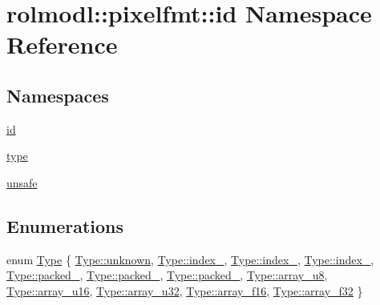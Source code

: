 \hypertarget{namespacerolmodl_1_1pixelfmt_1_1id}{}\section{rolmodl\+::pixelfmt\+::id Namespace Reference}
\label{namespacerolmodl_1_1pixelfmt_1_1id}
\subsection*{Namespaces}
\begin{DoxyCompactItemize}
\item 
 \mbox{\hyperlink{namespacerolmodl_1_1pixelfmt_1_1id_1_1id}{id}}
\item 
 \mbox{\hyperlink{namespacerolmodl_1_1pixelfmt_1_1id_1_1type}{type}}
\item 
 \mbox{\hyperlink{namespacerolmodl_1_1pixelfmt_1_1id_1_1unsafe}{unsafe}}
\end{DoxyCompactItemize}
\subsection*{Enumerations}
\begin{DoxyCompactItemize}
\item 
enum \mbox{\hyperlink{namespacerolmodl_1_1pixelfmt_1_1id_acacda2442a2997fe425e2faa4e5d002b}{Type}} \{ \newline
\mbox{\hyperlink{namespacerolmodl_1_1pixelfmt_1_1id_acacda2442a2997fe425e2faa4e5d002baad921d60486366258809553a3db49a4a}{Type\+::unknown}}, 
\mbox{\hyperlink{namespacerolmodl_1_1pixelfmt_1_1id_acacda2442a2997fe425e2faa4e5d002babe8994f2a03311f1f9ef19e65790e600}{Type\+::index\+\_}}, 
\mbox{\hyperlink{namespacerolmodl_1_1pixelfmt_1_1id_acacda2442a2997fe425e2faa4e5d002ba9d446f73c85fccc05401ee39c904efd9}{Type\+::index\+\_}}, 
\mbox{\hyperlink{namespacerolmodl_1_1pixelfmt_1_1id_acacda2442a2997fe425e2faa4e5d002ba8a55d2943b87abefaf052cb613ef6475}{Type\+::index\+\_}}, 
\newline
\mbox{\hyperlink{namespacerolmodl_1_1pixelfmt_1_1id_acacda2442a2997fe425e2faa4e5d002ba002adce035307176861ac153b4d4857b}{Type\+::packed\+\_}}, 
\mbox{\hyperlink{namespacerolmodl_1_1pixelfmt_1_1id_acacda2442a2997fe425e2faa4e5d002ba86ad119256480c275ed5cc8dda8609de}{Type\+::packed\+\_}}, 
\mbox{\hyperlink{namespacerolmodl_1_1pixelfmt_1_1id_acacda2442a2997fe425e2faa4e5d002ba661141124d10cca8a87010eec0e660aa}{Type\+::packed\+\_}}, 
\mbox{\hyperlink{namespacerolmodl_1_1pixelfmt_1_1id_acacda2442a2997fe425e2faa4e5d002ba05933fa063e4c493a75c932d3025edca}{Type\+::array\+\_\+u8}}, 
\newline
\mbox{\hyperlink{namespacerolmodl_1_1pixelfmt_1_1id_acacda2442a2997fe425e2faa4e5d002bac0a01d2a6c45cee947068d812dd9f30e}{Type\+::array\+\_\+u16}}, 
\mbox{\hyperlink{namespacerolmodl_1_1pixelfmt_1_1id_acacda2442a2997fe425e2faa4e5d002ba4eb884d17e8f672ce247585cdb37c8d8}{Type\+::array\+\_\+u32}}, 
\mbox{\hyperlink{namespacerolmodl_1_1pixelfmt_1_1id_acacda2442a2997fe425e2faa4e5d002ba54c46ef132d7c7bde5969b6ff933f8fa}{Type\+::array\+\_\+f16}}, 
\mbox{\hyperlink{namespacerolmodl_1_1pixelfmt_1_1id_acacda2442a2997fe425e2faa4e5d002baf284f908a3e233e8bf59bdcb9d4426a9}{Type\+::array\+\_\+f32}}
 \}
\end{DoxyCompactItemize}
